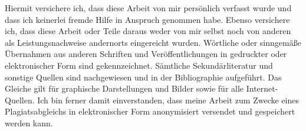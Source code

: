 \declarationofhonorchap

Hiermit versichere ich, dass diese Arbeit von mir pers{\"o}nlich verfasst wurde und dass ich keinerlei fremde Hilfe in Anspruch genommen habe. Ebenso versichere ich, dass diese Arbeit oder Teile daraus weder von mir selbst noch von anderen als Leistungsnachweise andernorts eingereicht wurden. W{\"o}rtliche oder sinngem{\"a}ße {\"U}bernahmen aus anderen Schriften und Ver{\"o}ffentlichungen in gedruckter oder elektronischer Form sind gekennzeichnet. S{\"a}mtliche Sekund{\"a}rliteratur und sonstige Quellen sind nachgewiesen und in der Bibliographie aufgef{\"u}hrt. Das Gleiche gilt f{\"u}r graphische Darstellungen und Bilder sowie f{\"u}r alle Internet-Quellen.
Ich bin ferner damit einverstanden, dass meine Arbeit zum Zwecke eines Plagiatsabgleichs in elektronischer Form anonymisiert versendet und gespeichert werden kann.

\vspace{1cm}
\noindent
{}

\vspace{1.5cm}
\noindent
\insertauthor
